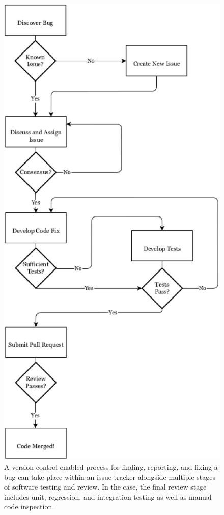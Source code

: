 \begin{figure}[htbp]
\begin{center}
\includegraphics[height=0.6\textheight]{./images/gitprocess}
\end{center}
\caption{A version-control enabled process for finding, reporting, and fixing a bug
can take place within an issue tracker alongside multiple stages of software
testing and review. In the \Cyclus case, the final review stage includes unit,
regression, and integration testing as well as manual code inspection.}
\label{fig:gitprocess}
\end{figure}

